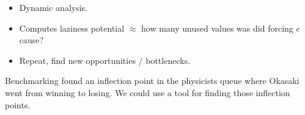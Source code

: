\documentclass{article}
\begin{document}

\begin{itemize}
\item Dynamic analysis.
\item Computes laziness potential $\approx$ how many unused values was did forcing $e$ cause?
\item Repeat, find new opportunities / bottlenecks.
\end{itemize}

Benchmarking found an inflection point in the physicists queue where Okasaki went from winning to losing.
We could use a tool for finding those inflection points.

\footnotesize


\end{document}
